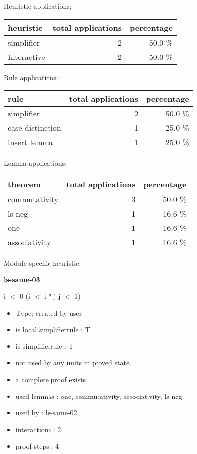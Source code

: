 \documentclass[a4paper]{article}
\begin{document}
\medskip


Heuristic applications:

\begin{supertabular}{l|r|r}
heuristic	& total applications & percentage \\ \hline
simplifier & 2 & 50.0 \% \\
Interactive & 2 & 50.0 \% \\

\end{supertabular}

Rule applications:

\begin{supertabular}{l|r|r}
rule	        & total applications & percentage \\ \hline
simplifier & 2 & 50.0 \% \\
case distinction & 1 & 25.0 \% \\
insert lemma & 1 & 25.0 \% \\

\end{supertabular}

Lemma applications:

\begin{supertabular}{l|r|r}
theorem	        & total applications & percentage \\ \hline
commutativity & 3 & 50.0 \% \\
ls-neg & 1 & 16.6 \% \\
one & 1 & 16.6 \% \\
associativity & 1 & 16.6 \% \\

\end{supertabular}

Module specific heuristic:

\pagebreak

{\LARGE\bf ls-same-03}\label{lemma-ls-same-03}

\medskip

 \Fol i $<$ 0 \Imp (i $<$ i $*$ j \Equiv j $<$ 1)

\begin{itemize}

\item Type: created by user

\item is local simplifierrule : T
\item is simplifierrule : T
\item not used by any units in proved state.
\item       a complete proof exists
\item       used lemmas  : one, commutativity, associativity, ls-neg
\item       used by      : le-same-02
\item       interactions : 2
\item       proof steps  : 4
\end{itemize}
\end{document}
